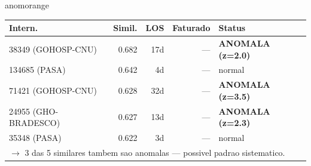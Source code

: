 \documentclass[a4paper,10pt]{article}
\begin{document}
\begin{anomalycard}[Internacao 157909 | GHO-PETROBRAS | ALTO (z=4.42)]{anomorange}
\begin{tabular}{l r r r l}\toprule\textbf{Intern.} & \textbf{Simil.} & \textbf{LOS} & \textbf{Faturado} & \textbf{Status} \\\midrule
38349 (GOHOSP-CNU) & 0.682 & 17d & --- & \textcolor{anomred}{\textbf{ANOMALA (z=2.0)}} \\
134685 (PASA) & 0.642 & 4d & --- & \textcolor{jcubeblue}{normal} \\
71421 (GOHOSP-CNU) & 0.628 & 32d & --- & \textcolor{anomred}{\textbf{ANOMALA (z=3.5)}} \\
24955 (GHO-BRADESCO) & 0.627 & 13d & --- & \textcolor{anomred}{\textbf{ANOMALA (z=2.3)}} \\
35348 (PASA) & 0.622 & 3d & --- & \textcolor{jcubeblue}{normal} \\
\multicolumn{5}{l}{\textcolor{anomred}{\small $\rightarrow$ 3 das 5 similares tambem sao anomalas --- possivel padrao sistematico.}} \\
\bottomrule\end{tabular}



\end{anomalycard}

\newpage
\end{document}

